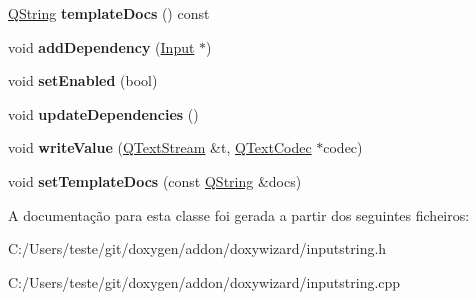 \begin{DoxyCompactItemize}
\item 
\hypertarget{class_input_string_a76f4a83c9cf30eb78d2b5f276cf649de}{\hyperlink{class_q_string}{Q\-String} {\bfseries template\-Docs} () const }\label{class_input_string_a76f4a83c9cf30eb78d2b5f276cf649de}

\item 
\hypertarget{class_input_string_a8bbd578a6cbf94a9a9250d0969df2dee}{void {\bfseries add\-Dependency} (\hyperlink{class_input}{Input} $\ast$)}\label{class_input_string_a8bbd578a6cbf94a9a9250d0969df2dee}

\item 
\hypertarget{class_input_string_ac34148588ffb4fc781ecfff97baa742c}{void {\bfseries set\-Enabled} (bool)}\label{class_input_string_ac34148588ffb4fc781ecfff97baa742c}

\item 
\hypertarget{class_input_string_a37cd3bc28aa6e7a7845bbaca9b007da2}{void {\bfseries update\-Dependencies} ()}\label{class_input_string_a37cd3bc28aa6e7a7845bbaca9b007da2}

\item 
\hypertarget{class_input_string_a9a9359fba2cb1dfbac6a19e36adbadf9}{void {\bfseries write\-Value} (\hyperlink{class_q_text_stream}{Q\-Text\-Stream} \&t, \hyperlink{class_q_text_codec}{Q\-Text\-Codec} $\ast$codec)}\label{class_input_string_a9a9359fba2cb1dfbac6a19e36adbadf9}

\item 
\hypertarget{class_input_string_a3736660c3a13fe78902eb7a843e7eb3f}{void {\bfseries set\-Template\-Docs} (const \hyperlink{class_q_string}{Q\-String} \&docs)}\label{class_input_string_a3736660c3a13fe78902eb7a843e7eb3f}

\end{DoxyCompactItemize}


A documentação para esta classe foi gerada a partir dos seguintes ficheiros\-:\begin{DoxyCompactItemize}
\item 
C\-:/\-Users/teste/git/doxygen/addon/doxywizard/inputstring.\-h\item 
C\-:/\-Users/teste/git/doxygen/addon/doxywizard/inputstring.\-cpp\end{DoxyCompactItemize}
